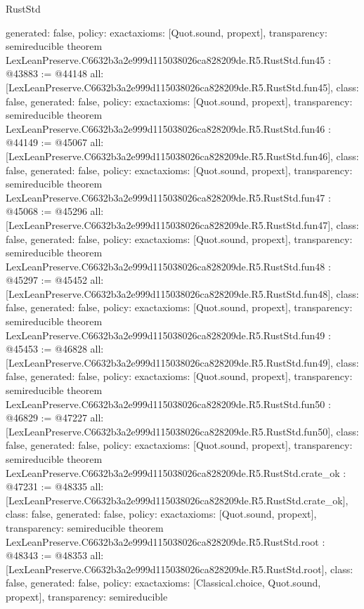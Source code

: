 \begin{lexlean}{RustStd}
\begin{coremodule}
{  generated: false,
  policy: exact{axioms: [Quot.sound, propext]},
  transparency: semireducible
}
theorem LexLeanPreserve.C6632b3a2e999d115038026ca828209de.R5.RustStd.fun45 : @43883 := @44148 {
  all: [LexLeanPreserve.C6632b3a2e999d115038026ca828209de.R5.RustStd.fun45],
  class: false,
  generated: false,
  policy: exact{axioms: [Quot.sound, propext]},
  transparency: semireducible
}
theorem LexLeanPreserve.C6632b3a2e999d115038026ca828209de.R5.RustStd.fun46 : @44149 := @45067 {
  all: [LexLeanPreserve.C6632b3a2e999d115038026ca828209de.R5.RustStd.fun46],
  class: false,
  generated: false,
  policy: exact{axioms: [Quot.sound, propext]},
  transparency: semireducible
}
theorem LexLeanPreserve.C6632b3a2e999d115038026ca828209de.R5.RustStd.fun47 : @45068 := @45296 {
  all: [LexLeanPreserve.C6632b3a2e999d115038026ca828209de.R5.RustStd.fun47],
  class: false,
  generated: false,
  policy: exact{axioms: [Quot.sound, propext]},
  transparency: semireducible
}
theorem LexLeanPreserve.C6632b3a2e999d115038026ca828209de.R5.RustStd.fun48 : @45297 := @45452 {
  all: [LexLeanPreserve.C6632b3a2e999d115038026ca828209de.R5.RustStd.fun48],
  class: false,
  generated: false,
  policy: exact{axioms: [Quot.sound, propext]},
  transparency: semireducible
}
theorem LexLeanPreserve.C6632b3a2e999d115038026ca828209de.R5.RustStd.fun49 : @45453 := @46828 {
  all: [LexLeanPreserve.C6632b3a2e999d115038026ca828209de.R5.RustStd.fun49],
  class: false,
  generated: false,
  policy: exact{axioms: [Quot.sound, propext]},
  transparency: semireducible
}
theorem LexLeanPreserve.C6632b3a2e999d115038026ca828209de.R5.RustStd.fun50 : @46829 := @47227 {
  all: [LexLeanPreserve.C6632b3a2e999d115038026ca828209de.R5.RustStd.fun50],
  class: false,
  generated: false,
  policy: exact{axioms: [Quot.sound, propext]},
  transparency: semireducible
}
theorem LexLeanPreserve.C6632b3a2e999d115038026ca828209de.R5.RustStd.crate_ok : @47231 := @48335 {
  all: [LexLeanPreserve.C6632b3a2e999d115038026ca828209de.R5.RustStd.crate_ok],
  class: false,
  generated: false,
  policy: exact{axioms: [Quot.sound, propext]},
  transparency: semireducible
}
theorem LexLeanPreserve.C6632b3a2e999d115038026ca828209de.R5.RustStd.root : @48343 := @48353 {
  all: [LexLeanPreserve.C6632b3a2e999d115038026ca828209de.R5.RustStd.root],
  class: false,
  generated: false,
  policy: exact{axioms: [Classical.choice, Quot.sound, propext]},
  transparency: semireducible
}


\end{coremodule}
\end{lexlean}

